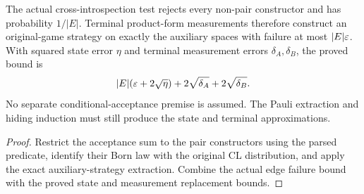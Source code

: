 \begin{lemma}
\label{lem:intro-typed-final-extraction}
\leanok
The actual cross-introspection test rejects every non-pair constructor and
has probability $1/|E|$. Terminal product-form measurements therefore
construct an original-game strategy on exactly the auxiliary spaces with
failure at most $|E|\varepsilon$. With squared state error $\eta$ and terminal
measurement errors $\delta_A,\delta_B$, the proved bound is
\[
 |E|(\varepsilon+2\sqrt{\eta})+2\sqrt{\delta_A}+2\sqrt{\delta_B}.
\]
No separate conditional-acceptance premise is assumed. The Pauli extraction
and hiding induction must still produce the state and terminal approximations.
\end{lemma}
\begin{proof}
\leanok
Restrict the acceptance sum to the pair constructors using the parsed
predicate, identify their Born law with the original CL distribution, and
apply the exact auxiliary-strategy extraction. Combine the actual edge
failure bound with the proved state and measurement replacement bounds.
\end{proof}

